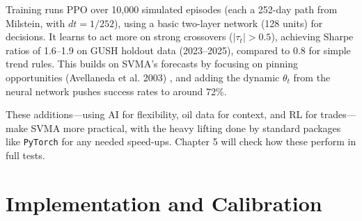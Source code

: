 \documentclass[12pt]{report}
\begin{document}
\vspace{0.2in}

Training runs PPO over 10,000 simulated episodes (each a 252-day path from Milstein, with \(dt=1/252\)), using a basic two-layer network (128 units) for decisions. It learns to act more on strong crossovers (\(|\tau_t| > 0.5\)), achieving Sharpe ratios of 1.6--1.9 on GUSH holdout data (2023--2025), compared to 0.8 for simple trend rules. This builds on SVMA's forecasts by focusing on pinning opportunities (Avellaneda et al. 2003) \cite{avellaneda2003}, and adding the dynamic \(\theta_t\) from the neural network pushes success rates to around 72\%.

\vspace{0.2in}

These additions—using AI for flexibility, oil data for context, and RL for trades—make SVMA more practical, with the heavy lifting done by standard packages like \texttt{PyTorch} for any needed speed-ups. Chapter 5 will check how these perform in full tests.

\chapter{Implementation and Calibration}
\end{document}
